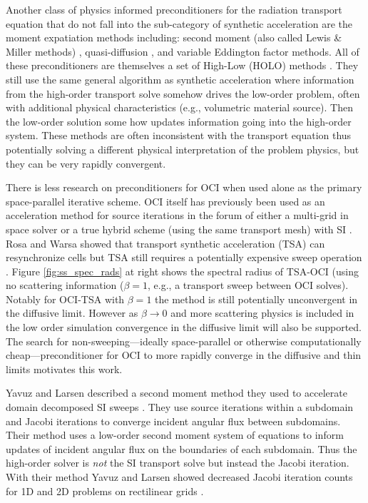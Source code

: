 Another class of physics informed preconditioners for the radiation transport equation that do not fall into the sub-category of synthetic acceleration are the moment expatiation methods including: second moment (also called Lewis \& Miller methods) \cite{olivier_2024_smoms, lewis_computational_1984, oliver_2025_secondmoment}, quasi-diffusion \cite{ani_1986_quasidiffusion, goldin_1964_quasidissuion}, and variable Eddington factor \cite{lou_2021_vef, coale_2024_rmomvef} methods.
All of these preconditioners are themselves a set of High-Low (HOLO) methods \cite{chacon_2017_holosurvey}.
They still use the same general algorithm as synthetic acceleration where information from the high-order transport solve somehow drives the low-order problem, often with additional physical characteristics (e.g., volumetric material source).
Then the low-order solution some how updates information going into the high-order system.
These methods are often inconsistent with the transport equation thus potentially solving a different physical interpretation of the problem physics, but they can be very rapidly convergent.

There is less research on preconditioners for OCI when used alone as the primary space-parallel iterative scheme.
OCI itself has previously been used as an acceleration method for source iterations in the forum of either a multi-grid in space solver \cite{kang2000oci, man1994parallel} or a true hybrid scheme (using the same transport mesh) with SI \cite{hoagland_hybrid_2021}.
Rosa and Warsa showed that transport synthetic acceleration (TSA) can resynchronize cells but TSA still requires a potentially expensive sweep operation \cite{tsa2009rosa}.
Figure \ref{fig:ss_spec_rads} at right shows the spectral radius of TSA-OCI (using no scattering information ($\beta=1$, e.g., a transport sweep between OCI solves).
Notably for OCI-TSA with $\beta=1$ the method is still potentially unconvergent in the diffusive limit.
However as $\beta\rightarrow0$ and more scattering physics is included in the low order simulation convergence in the diffusive limit will also be supported.
The search for non-sweeping---ideally space-parallel or otherwise computationally cheap---preconditioner for OCI to more rapidly converge in the diffusive and thin limits motivates this work.

Yavuz and Larsen described a second moment method they used to accelerate domain decomposed SI sweeps \cite{yavuz_spatial_1989}.
They use source iterations within a subdomain and Jacobi iterations to converge incident angular flux between subdomains.
Their method uses a low-order second moment system of equations to inform updates of incident angular flux on the boundaries of each subdomain.
Thus the high-order solver is \textit{not} the SI transport solve but instead the Jacobi iteration.
With their method Yavuz and Larsen showed decreased Jacobi iteration counts for 1D and 2D problems on rectilinear grids \cite{yavuz_spatial_1989, yavuz_1992_2ddd}.

